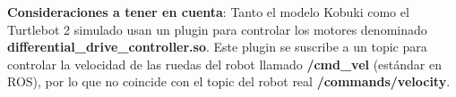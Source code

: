 \textbf{Consideraciones a tener en cuenta}: Tanto el modelo Kobuki como el Turtlebot 2 simulado usan un plugin para controlar los motores denominado \textbf{differential\_drive\_controller.so}. Este plugin se suscribe a un topic para controlar la velocidad de las ruedas del robot llamado \textbf{/cmd\_vel} (estándar en ROS), por lo que no coincide con el topic del robot real \textbf{/commands/velocity}. 


